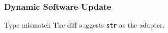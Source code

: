 \documentclass{beamer}
\begin{document}
\begin{frame}[fragile]
  \frametitle{Dynamic Software Update}
  \begin{block}{Type mismatch}
    The diff suggests \verb|str| as the adapter.
  \end{block}

  \begin{example}
    
  \end{example}
\end{frame}
\end{document}
